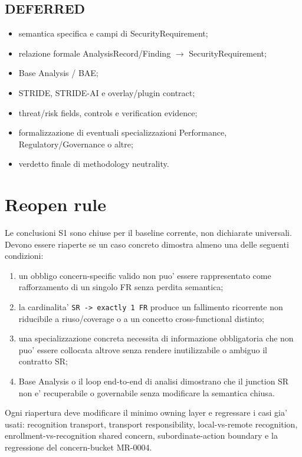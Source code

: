 \documentclass[11pt,a4paper]{article}
\newcommand{\deferred}{\textbf{DEFERRED}}
\begin{document}
\subsection*{\deferred}
\begin{itemize}
  \item semantica specifica e campi di SecurityRequirement;
  \item relazione formale AnalysisRecord/Finding $\rightarrow$ SecurityRequirement;
  \item Base Analysis / BAE;
  \item STRIDE, STRIDE-AI e overlay/plugin contract;
  \item threat/risk fields, controls e verification evidence;
  \item formalizzazione di eventuali specializzazioni Performance, Regulatory/Governance o altre;
  \item verdetto finale di methodology neutrality.
\end{itemize}

\section{Reopen rule}

Le conclusioni S1 sono chiuse per il baseline corrente, non dichiarate universali. Devono essere riaperte se un caso concreto dimostra almeno una delle seguenti condizioni:

\begin{enumerate}
  \item un obbligo concern-specific valido non puo' essere rappresentato come rafforzamento di un singolo FR senza perdita semantica;
  \item la cardinalita' \texttt{SR -> exactly 1 FR} produce un fallimento ricorrente non riducibile a riuso/coverage o a un concetto cross-functional distinto;
  \item una specializzazione concreta necessita di informazione obbligatoria che non puo' essere collocata altrove senza rendere inutilizzabile o ambiguo il contratto SR;
  \item Base Analysis o il loop end-to-end di analisi dimostrano che il junction SR non e' recuperabile o governabile senza modificare la semantica chiusa.
\end{enumerate}

Ogni riapertura deve modificare il minimo owning layer e regressare i casi gia' usati: recognition transport, transport responsibility, local-vs-remote recognition, enrollment-vs-recognition shared concern, subordinate-action boundary e la regressione del concern-bucket MR-0004.
\end{document}
